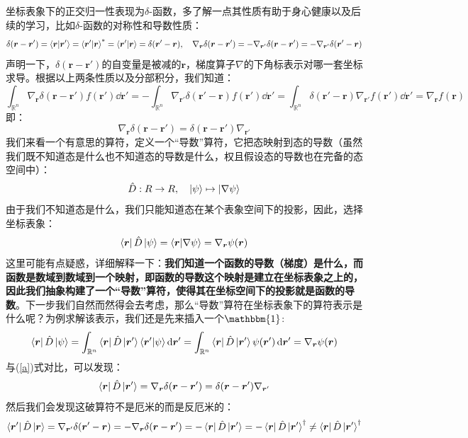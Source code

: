 坐标表象下的正交归一性表现为$\delta$-函数，多了解一点其性质有助于身心健康以及后续的学习，比如$\delta$-函数的对称性和导数性质：
\[\delta(\bm{r}-\bm{r}')=\bra{\bm{r}}\ket{\bm{r}'}=\bra{\bm{r}'}\ket{\bm{r}}^*=\bra{\bm{r}'}\ket{\bm{r}}=\delta(\bm{r}'-\bm{r}), \quad \nabla_{\bm{r}}\delta(\bm{r}-\bm{r}')=-\nabla_{\bm{r}'}\delta(\bm{r}-\bm{r}')=-\nabla_{\bm{r}'}\delta(\bm{r}'-\bm{r})\]
声明一下，$\delta(\bm{r}-\bm{r}')$的自变量是被减的$\bm{r}$，梯度算子$\nabla$的下角标表示对哪一套坐标求导。根据以上两条性质以及分部积分，我们知道：
\[\int_{\mathbb{R}^n}\nabla_{\bm{r}}\delta(\bm{r}-\bm{r}')f(\bm{r}')\dd{\bm{r}'}=-\int_{\mathbb{R}^n}\nabla_{\bm{r'}}\delta(\bm{r}'-\bm{r})f(\bm{r}')\dd{\bm{r}'}=\int_{\mathbb{R}^n}\delta(\bm{r}'-\bm{r})\nabla_{\bm{r'}}f(\bm{r}')\dd{\bm{r}'}=\nabla_{\bm{r}}f(\bm{r}) \tag{a}\label{a}\]
即：
\[\nabla_{\bm{r}}\delta(\bm{r}-\bm{r}')=\delta(\bm{r}-\bm{r}')\nabla_{\bm{r}'}\]
我们来看一个有意思的算符，定义一个“导数”算符，它把态映射到态的导数（虽然我们既不知道态是什么也不知道态的导数是什么，权且假设态的导数也在完备的态空间中）：
\[\hat{D}:R \to R, \quad \ket{\psi} \mapsto \ket{\nabla\psi} \]
由于我们不知道态是什么，我们只能知道态在某个表象空间下的投影，因此，选择坐标表象：
\[\bra{\bm{r}}\hat{D}\ket{\psi}=\bra{\bm{r}}\ket{\nabla\psi}=\nabla_{\bm{r}}\psi(\bm{r})\]
这里可能有点疑惑，详细解释一下：\textbf{我们知道一个函数的导数（梯度）是什么，而函数是数域到数域到一个映射，即函数的导数这个映射是建立在坐标表象之上的，因此我们抽象构建了一个“导数”算符，使得其在坐标空间下的投影就是函数的导数}。下一步我们自然而然得会去考虑，那么“导数”算符在坐标表象下的算符表示是什么呢？为例求解该表示，我们还是先来插入一个$\mathbbm{1}$:
\[\bra{\bm{r}}\hat{D}\ket{\psi}=\int_{\mathbb{R}^n}\bra{\bm{r}}\hat{D}\ket{\bm{r}'}\bra{\bm{r}'}\ket{\psi}\dd{\bm{r}'}=\int_{\mathbb{R}^n}\bra{\bm{r}}\hat{D}\ket{\bm{r}'}\psi(\bm{r}')\dd{\bm{r}'}=\nabla_{\bm{r}}\psi(\bm{r})\]
与(\ref{a})式对比，可以发现：
\[\bra{\bm{r}}\hat{D}\ket{\bm{r}'}=\nabla_{\bm{r}}\delta(\bm{r}-\bm{r}')=\delta(\bm{r}-\bm{r}')\nabla_{\bm{r}'}\]
然后我们会发现这破算符不是厄米的而是反厄米的：
\[\bra{\bm{r}'}\hat{D}\ket{\bm{r}}=\nabla_{\bm{r}'}\delta(\bm{r}'-\bm{r})=-\nabla_{\bm{r}}\delta(\bm{r}-\bm{r}')=-\bra{\bm{r}}\hat{D}\ket{\bm{r}'}=-\bra{\bm{r}}\hat{D}\ket{\bm{r}'}^{\dagger}\neq\bra{\bm{r}}\hat{D}\ket{\bm{r}'}^{\dagger}\]

